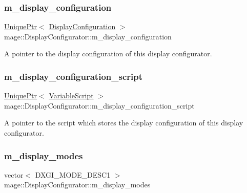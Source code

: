 \subsubsection{\texorpdfstring{m\+\_\+display\+\_\+configuration}{m\_display\_configuration}}
{\footnotesize\ttfamily \hyperlink{namespacemage_a3316d7143a973e37adf1110f2e80ca31}{Unique\+Ptr}$<$ \hyperlink{structmage_1_1_display_configuration}{Display\+Configuration} $>$ mage\+::\+Display\+Configurator\+::m\+\_\+display\+\_\+configuration\hspace{0.3cm}{\ttfamily [private]}}

A pointer to the display configuration of this display configurator. \hypertarget{classmage_1_1_display_configurator_ab4030a5fe67b8253113799f42a0868c0}{}\label{classmage_1_1_display_configurator_ab4030a5fe67b8253113799f42a0868c0} 
\subsubsection{\texorpdfstring{m\+\_\+display\+\_\+configuration\+\_\+script}{m\_display\_configuration\_script}}
{\footnotesize\ttfamily \hyperlink{namespacemage_a3316d7143a973e37adf1110f2e80ca31}{Unique\+Ptr}$<$ \hyperlink{classmage_1_1_variable_script}{Variable\+Script} $>$ mage\+::\+Display\+Configurator\+::m\+\_\+display\+\_\+configuration\+\_\+script\hspace{0.3cm}{\ttfamily [private]}}

A pointer to the script which stores the display configuration of this display configurator. \hypertarget{classmage_1_1_display_configurator_a714608c9858f92cead47314295f17f96}{}\label{classmage_1_1_display_configurator_a714608c9858f92cead47314295f17f96} 
\subsubsection{\texorpdfstring{m\+\_\+display\+\_\+modes}{m\_display\_modes}}
{\footnotesize\ttfamily vector$<$ D\+X\+G\+I\+\_\+\+M\+O\+D\+E\+\_\+\+D\+E\+S\+C1 $>$ mage\+::\+Display\+Configurator\+::m\+\_\+display\+\_\+modes\hspace{0.3cm}{\ttfamily [private]}}


